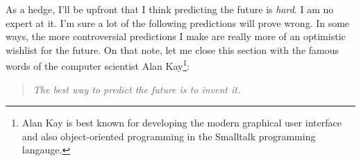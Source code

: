 As a hedge, I'll be upfront that I think predicting the future is
\emph{hard}. I am no expert at it. I'm sure a lot of the following predictions
will prove wrong. In some ways, the more controversial predictions I make are
really more of an optimistic wishlist for the future. On that note, let me
close this section with the famous words of the computer scientist Alan
Kay\footnote{Alan Kay is best known for developing the modern graphical user
interface and also object-oriented programming in the Smalltalk programming
langauge.}:
\begin{quote}
    \emph{The best way to predict the future is to invent it.}
\end{quote}
